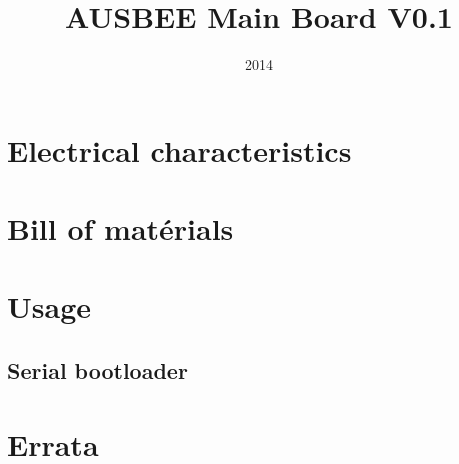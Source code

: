 \documentclass[11pt,a4paper]{book}
\title{AUSBEE Main Board V0.1}
\author{}
\date{2014}
\begin{document}
  
  \maketitle

  \tableofcontents

  \chapter{Electrical characteristics}
  
  \chapter{Bill of matérials}
  
  \chapter{Usage}
  
  \section{Serial bootloader}
  
  \chapter{Errata}
\end{document}
